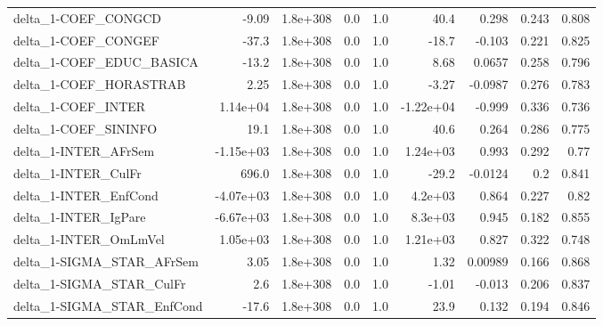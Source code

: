 \begin{tabular}{lrrrrrrrr}
delta\_1-COEF\_CONGCD                   &       -9.09 &     1.8e+308 &      0.0 &      1.0 &       40.4 &       0.298 &        0.243 &         0.808 \\
delta\_1-COEF\_CONGEF                   &       -37.3 &     1.8e+308 &      0.0 &      1.0 &      -18.7 &      -0.103 &        0.221 &         0.825 \\
delta\_1-COEF\_EDUC\_BASICA              &       -13.2 &     1.8e+308 &      0.0 &      1.0 &       8.68 &      0.0657 &        0.258 &         0.796 \\
delta\_1-COEF\_HORASTRAB                &        2.25 &     1.8e+308 &      0.0 &      1.0 &      -3.27 &     -0.0987 &        0.276 &         0.783 \\
delta\_1-COEF\_INTER                    &    1.14e+04 &     1.8e+308 &      0.0 &      1.0 &  -1.22e+04 &      -0.999 &        0.336 &         0.736 \\
delta\_1-COEF\_SININFO                  &        19.1 &     1.8e+308 &      0.0 &      1.0 &       40.6 &       0.264 &        0.286 &         0.775 \\
delta\_1-INTER\_AFrSem                  &   -1.15e+03 &     1.8e+308 &      0.0 &      1.0 &   1.24e+03 &       0.993 &        0.292 &          0.77 \\
delta\_1-INTER\_CulFr                   &       696.0 &     1.8e+308 &      0.0 &      1.0 &      -29.2 &     -0.0124 &          0.2 &         0.841 \\
delta\_1-INTER\_EnfCond                 &   -4.07e+03 &     1.8e+308 &      0.0 &      1.0 &    4.2e+03 &       0.864 &        0.227 &          0.82 \\
delta\_1-INTER\_IgPare                  &   -6.67e+03 &     1.8e+308 &      0.0 &      1.0 &    8.3e+03 &       0.945 &        0.182 &         0.855 \\
delta\_1-INTER\_OmLmVel                 &    1.05e+03 &     1.8e+308 &      0.0 &      1.0 &   1.21e+03 &       0.827 &        0.322 &         0.748 \\
delta\_1-SIGMA\_STAR\_AFrSem             &        3.05 &     1.8e+308 &      0.0 &      1.0 &       1.32 &     0.00989 &        0.166 &         0.868 \\
delta\_1-SIGMA\_STAR\_CulFr              &         2.6 &     1.8e+308 &      0.0 &      1.0 &      -1.01 &      -0.013 &        0.206 &         0.837 \\
delta\_1-SIGMA\_STAR\_EnfCond            &       -17.6 &     1.8e+308 &      0.0 &      1.0 &       23.9 &       0.132 &        0.194 &         0.846 \\

\end{tabular}

